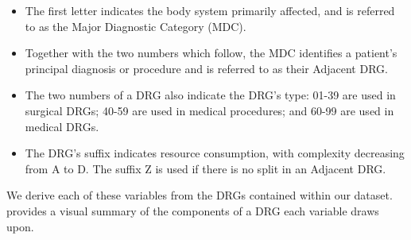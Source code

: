 \documentclass[submission]{grattan}
\begin{document}
\begin{itemize}
\item
  The first letter indicates the body system primarily affected, and is referred to as the Major Diagnostic Category (MDC).
\item
  Together with the two numbers which follow, the MDC identifies a patient's principal diagnosis or procedure and is referred to as their Adjacent DRG\@.
\item
  The two numbers of a DRG also indicate the DRG's type: 01-39 are used in surgical DRGs; 40-59 are used in medical procedures; and 60-99 are used in medical DRGs.
\item
  The DRG's suffix indicates resource consumption, with complexity decreasing from A to D\@.
The suffix Z is used if there is no split in an Adjacent DRG.
\end{itemize}

We derive each of these variables from the DRGs contained within our dataset.
 provides a visual summary of the components of a DRG each variable draws upon.
\end{document}

